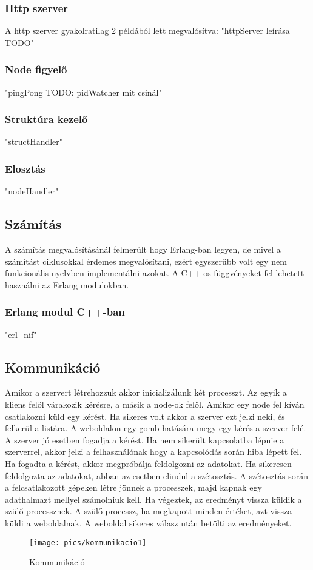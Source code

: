 	\subsubsection{Http szerver}
	A http szerver gyakolratilag 2 példából lett megvalósítva:
	"httpServer leírása TODO"
	\subsubsection{Node figyelő}
	"pingPong TODO: pidWatcher mit csinál"
	\subsubsection{Struktúra kezelő}
	"structHandler"
	\subsubsection{Elosztás}
	"nodeHandler"

\subsection{Számítás}
	A számítás megvalósításánál felmerült hogy Erlang-ban legyen, de mivel a számítást ciklusokkal érdemes megvalósítani, ezért egyszerűbb volt egy nem funkcionális nyelvben implementálni azokat.
	A C++-os függvényeket fel lehetett használni az Erlang modulokban.
	\newline
	\subsubsection{Erlang modul C++-ban}
	"erl\_nif"
\subsection{Kommunikáció}
	Amikor a szervert létrehozzuk akkor inicializálunk két processzt. Az egyik a kliens felől várakozik kérésre, a másik a node-ok felől. Amikor egy node fel kíván csatlakozni küld egy kérést. Ha sikeres volt akkor a szerver ezt jelzi neki, és felkerül a listára. \newline
	A weboldalon egy gomb hatására megy egy kérés a szerver felé. A szerver jó esetben fogadja a kérést. Ha nem sikerült kapcsolatba lépnie a szerverrel, akkor jelzi a felhasználónak hogy a kapcsolódás során hiba lépett fel. \newline
	Ha fogadta a kérést, akkor megpróbálja feldolgozni az adatokat. Ha sikeresen feldolgozta az adatokat, abban az esetben elindul a szétosztás. \newline
	A szétosztás során a felcsatlakozott gépeken létre jönnek a processzek, majd kapnak egy adathalmazt mellyel számolniuk kell. Ha végeztek, az eredményt vissza küldik a szülő processznek. A szülő processz, ha megkapott minden értéket, azt vissza küldi a weboldalnak.
	\newline
	A weboldal sikeres válasz után betölti az eredményeket. 
	\begin{figure}[h]
		\texttt{[image: pics/kommunikacio1]}
	\centering
	\caption{Kommunikáció\label{fig:kommunikacio1}}
	\end{figure}

